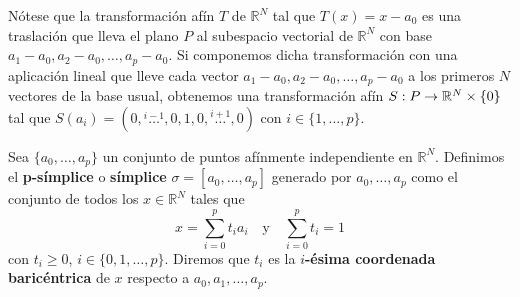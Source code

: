 Nótese que la transformación afín $T$ de $\mathbb{R}^{N}$ tal que
$T(x) = x - a_{0}$ es una traslación que lleva el plano $P$ al subespacio
vectorial de $\mathbb{R}^{N}$ con base
$a_{1}-a_{0}, a_{2}-a_{0}, \dots, a_{p}-a_{0}$. Si componemos dicha transformación
con una aplicación lineal que lleve cada vector $a_{1}-a_{0}, a_{2}-a_{0}, \dots,
a_{p}-a_{0}$ a los primeros $N$ vectores de la base usual, obtenemos una
transformación afín $S: P \rightarrow \mathbb{R}^{N} \times \{0\}$ tal que
$S(a_{i}) = (0, \overset{i-1}{\dots}, 0, 1, 0, \overset{i+1}{\dots}, 0)$ con
$i \in \{1, \dots, p\}$.

\begin{definicion}
	\label{def:simplex}
	Sea $\{a_{0}, \dots, a_{p}\}$ un conjunto de puntos afínmente independiente en
	$\mathbb{R}^{N}$. Definimos el \textbf{p-símplice} o \textbf{símplice}
	$\sigma = [a_{0}, \dots, a_{p}]$ generado por $a_{0}, \dots, a_{p}$ como el
	conjunto de todos los $x \in \mathbb{R}^{N}$ tales que
	\[
	x=\sum_{i=0}^{p}t_{i}a_{i} \quad \text{y}\quad \sum_{i=0}^{p}t_{i}=1
	\]
	con $t_{i} \geq 0$, $i \in \{0, 1, \dots, p\}$. Diremos que $t_i$ es la \textbf{$i$-ésima coordenada baricéntrica} de $x$ respecto a $a_0, a_1, \ldots, a_p$.
\end{definicion}


